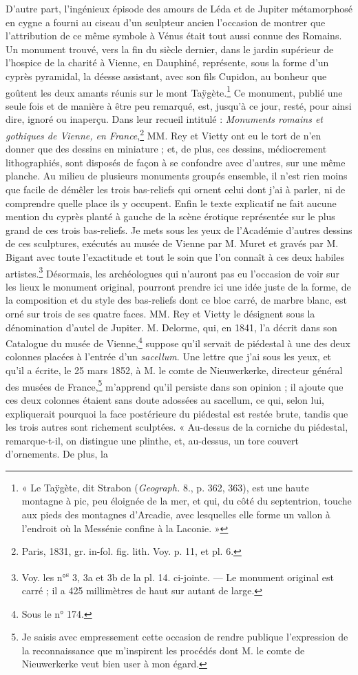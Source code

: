 \documentclass{article}
\begin{document}
D'autre part, l'ingénieux épisode des amours de Léda et de Jupiter métamorphosé en cygne a fourni au ciseau d'un sculpteur ancien l'occasion de montrer que l'attribution de ce même symbole à Vénus était tout aussi connue des Romains. Un monument trouvé, vers la fin du siècle dernier, dans le jardin supérieur de l'hospice de la charité à Vienne, en Dauphiné, représente, sous la forme d'un cyprès pyramidal, la déesse assistant, avec son fils Cupidon, au bonheur que goûtent les deux amants réunis sur le mont Taÿgète.\footnote{« Le Taÿgète, dit Strabon (\emph{Geograph.} 8., p. 362, 363), est une haute montagne à pic, peu éloignée de la mer, et qui, du côté du septentrion, touche aux pieds des montagnes d'Arcadie, avec lesquelles elle forme un vallon à l'endroit où la Messénie confine à la Laconie. »} Ce monument, publié une seule fois et de manière à être peu remarqué, est, jusqu'à ce jour, resté, pour ainsi dire, ignoré ou inaperçu. Dans leur recueil intitulé : \emph{Monuments romains et gothiques de Vienne, en France},\footnote{Paris, 1831, gr. in-fol. fig. lith. Voy. p. 11, et pl. 6.} MM. Rey et Vietty ont eu le tort de n'en donner que des dessins en miniature ; et, de plus, ces dessins, médiocrement lithographiés, sont disposés de façon à se confondre avec d'autres, sur une même planche. Au milieu de plusieurs monuments groupés ensemble, il n'est rien moins que facile de démêler les trois bas-reliefs qui ornent celui dont j'ai à parler, ni de comprendre quelle place ils y occupent. Enfin le texte explicatif ne fait aucune mention du cyprès planté à gauche de la scène érotique représentée sur le plus grand de ces trois bas-reliefs. Je mets sous les yeux de l'Académie d'autres dessins de ces sculptures, exécutés au musée de Vienne par M. Muret et gravés par M. Bigant avec toute l'exactitude et tout le soin que l'on connaît à ces deux habiles artistes.\footnote{Voy. les n°\textsuperscript{s} 3, 3a et 3b de la pl. 14. ci-jointe. --- Le monument original est carré ; il a 425 millimètres de haut sur autant de large.} Désormais, les archéologues qui n'auront pas eu l'occasion de voir sur les lieux le monument original, pourront prendre ici une idée juste de la forme, de la composition et du style des bas-reliefs dont ce bloc carré, de marbre blanc, est orné sur trois de ses quatre faces. MM. Rey et Vietty le désignent sous la dénomination d'autel de Jupiter. M. Delorme, qui, en 1841, l'a décrit dans son Catalogue du musée de Vienne,\footnote{Sous le n° 174.} suppose qu'il servait de piédestal à une des deux colonnes placées à l'entrée d'un \emph{sacellum}. Une lettre que j'ai sous les yeux, et qu'il a écrite, le 25 mars 1852, à M. le comte de Nieuwerkerke, directeur général des musées de France,\footnote{Je saisis avec empressement cette occasion de rendre publique l'expression de la reconnaissance que m'inspirent les procédés dont M. le comte de Nieuwerkerke veut bien user à mon égard.} m'apprend qu'il persiste dans son opinion ; il ajoute que ces deux colonnes étaient sans doute adossées au sacellum, ce qui, selon lui, expliquerait pourquoi la face postérieure du piédestal est restée brute, tandis que les trois autres sont richement sculptées. « Au-dessus de la corniche du piédestal, remarque-t-il, on distingue une plinthe, et, au-dessus, un tore couvert d'ornements. De plus, la 
\end{document}
